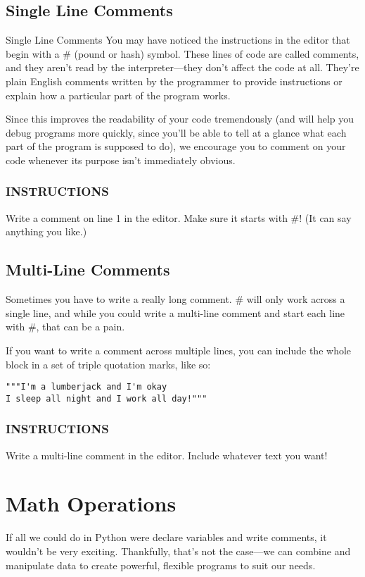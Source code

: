\documentclass[12pt,a4paper,final,twoside,onecolumn,titlepage]{book}
\begin{document}
\subsection{Single Line Comments}
Single Line Comments
You may have noticed the instructions in the editor that begin with a \# (pound or hash) symbol. These lines of code are called comments, and they aren't read by the interpreter—they don't affect the code at all. They're plain English comments written by the programmer to provide instructions or explain how a particular part of the program works.

Since this improves the readability of your code tremendously (and will help you debug programs more quickly, since you'll be able to tell at a glance what each part of the program is supposed to do), we encourage you to comment on your code whenever its purpose isn't immediately obvious.

\subsubsection{INSTRUCTIONS}
Write a comment on line 1 in the editor. Make sure it starts with \#! (It can say anything you like.)

\subsection{Multi-Line Comments}
Sometimes you have to write a really long comment. \# will only work across a single line, and while you could write a multi-line comment and start each line with \#, that can be a pain.

If you want to write a comment across multiple lines, you can include the whole block in a set of triple quotation marks, like so:
\begin{lstlisting}
"""I'm a lumberjack and I'm okay
I sleep all night and I work all day!"""
\end{lstlisting}

\subsubsection{INSTRUCTIONS}
Write a multi-line comment in the editor. Include whatever text you want!

\section{Math Operations}
If all we could do in Python were declare variables and write comments, it wouldn't be very exciting. Thankfully, that's not the case—we can combine and manipulate data to create powerful, flexible programs to suit our needs.
\end{document}
